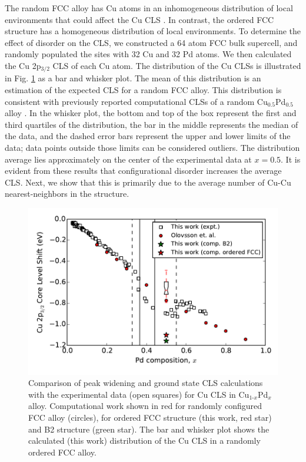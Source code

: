 \documentclass[number, sort&compress, review, 12pt]{elsarticle}
\begin{document}
The random FCC alloy has Cu atoms in an inhomogeneous distribution of local environments that could affect the Cu CLS \cite{marten-2005-ab-initio}. In contrast, the ordered FCC structure has a homogeneous distribution of local environments. To determine the effect of disorder on the CLS, we constructed a 64 atom FCC bulk supercell, and randomly populated the sites with 32 Cu and 32 Pd atoms. We then calculated the Cu 2p$_{\text{3/2}}$ CLS of each Cu atom. The distribution of the Cu CLSs is illustrated in Fig. \ref{fig-result} as a bar and whisker plot. The mean of this distribution is an estimation of the expected CLS for a random FCC alloy. This distribution is consistent with previously reported computational CLSs of a random Cu$_{\text{0.5}}$Pd$_{\text{0.5}}$ alloy \cite{olovsson-2006-core-level}. In the whisker plot, the bottom and top of the box represent the first and third quartiles of the distribution, the bar in the middle represents the median of the data, and the dashed error bars represent the upper and lower limits of the data; data points outside those limits can be considered outliers. The distribution average lies approximately on the center of the experimental data at $x = 0.5$. It is evident from these results that configurational disorder increases the average CLS. Next, we show that this is primarily due to the average number of Cu-Cu nearest-neighbors in the structure.

\begin{figure}[H]
\centering
\includegraphics[width=6in]{result}
\caption{\label{fig-result}Comparison of peak widening and ground state CLS calculations with the experimental data (open squares) for Cu CLS in Cu$_{\text{1-}x}$Pd$_x$ alloy. Computational work \cite{olovsson-2002-core-level} shown in red for randomly configured FCC alloy (circles), for ordered FCC structure (this work, red star) and B2 structure (green star). The bar and whisker plot shows the calculated (this work) distribution of the Cu CLS in a randomly ordered FCC alloy.}
\end{figure}
\end{document}
